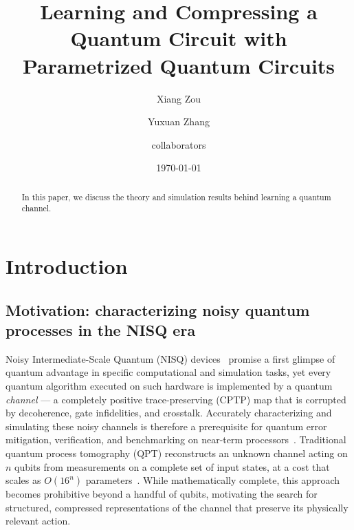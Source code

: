\documentclass[%
 reprint,
superscriptaddress,
 amsmath,amssymb,
 aps,
]{revtex4-2}
\begin{document}

\title{Learning and Compressing a Quantum Circuit with Parametrized Quantum Circuits}%

\author{Xiang Zou}
\author{Yuxuan Zhang}%
%
\author{collaborators}%
%
\date{\today}%

\begin{abstract}
In this paper, we discuss the theory and simulation results behind learning a quantum channel.
\end{abstract}

\maketitle


\section{Introduction}

\subsection*{Motivation: characterizing noisy quantum processes in the NISQ era}

Noisy Intermediate-Scale Quantum (NISQ) devices~\cite{preskill2018nisq} promise a first glimpse of quantum advantage in specific computational and simulation tasks, yet every quantum algorithm executed on such hardware is implemented by a quantum \emph{channel} — a completely positive trace-preserving (CPTP) map that is corrupted by decoherence, gate infidelities, and crosstalk. Accurately characterizing and simulating these noisy channels is therefore a prerequisite for quantum error mitigation, verification, and benchmarking on near-term processors~\cite{bharti2022nisq,cerezo2021variational}. Traditional quantum process tomography (QPT) reconstructs an unknown channel acting on $n$ qubits from measurements on a complete set of input states, at a cost that scales as $O(16^n)$ parameters~\cite{chuang1997prescription,mohseni2008tomography}. While mathematically complete, this approach becomes prohibitive beyond a handful of qubits, motivating the search for structured, compressed representations of the channel that preserve its physically relevant action.
\end{document}
